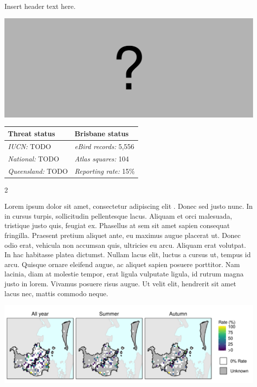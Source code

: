 \documentclass[12pt,openany,oneside]{book}
\let\origfigure\figure
\let\endorigfigure\endfigure
\renewenvironment{figure}[1][2] {
  \expandafter\origfigure\expandafter[H]
} {
  \endorigfigure
}
\let\Begin\begin
\let\End\end
\theoremstyle{definition}
\theoremstyle{definition}
\theoremstyle{definition}
\theoremstyle{remark}
\begin{document}

Insert header text here.

\begin{figure}
\centering
\includegraphics[width=\textwidth,keepaspectratio=true]{assets/misc/missing-profile.png}
\caption{Insert caption here.}
\end{figure}

\begin{tabu} to 
\toprule
Threat status & Brisbane status\\
\midrule
\textit{IUCN:} TODO & \textit{eBird records:} 5,556\\
\textit{National:} TODO & \textit{Atlas squares:} 104\\
\textit{Queensland:} TODO & \textit{Reporting rate:} 15\%\\
\bottomrule
\end{tabu} 
\vspace{0.15cm}

\Begin{multicols}{2}

Lorem ipsum dolor sit amet, consectetur adipiscing elit
\citep{rexample1, rexample2, rexample3}. Donec sed justo nunc. In in
cursus turpis, sollicitudin pellentesque lacus. Aliquam et orci
malesuada, tristique justo quis, feugiat ex. Phasellus at sem sit amet
sapien consequat fringilla. Praesent pretium aliquet ante, eu maximus
augue placerat ut. Donec odio erat, vehicula non accumsan quis,
ultricies eu arcu. Aliquam erat volutpat. In hac habitasse platea
dictumst. Nullam lacus elit, luctus a cursus ut, tempus id arcu. Quisque
ornare eleifend augue, ac aliquet sapien posuere porttitor. Nam lacinia,
diam at molestie tempor, erat ligula vulputate ligula, id rutrum magna
justo in lorem. Vivamus posuere risus augue. Ut velit elit, hendrerit
sit amet lacus nec, mattis commodo neque.

\End{multicols}

\clearpage

\begin{figure}
\centering
\includegraphics[height=0.47\textheight,width=\textwidth,keepaspectratio=true]{assets/maps/Aythya-australis.png}
\end{figure}
\end{document}
